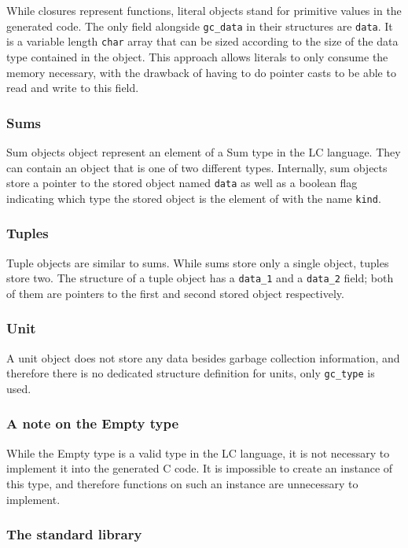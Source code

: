 \documentclass[12pt]{article}
\begin{document}
While closures represent functions, literal objects stand for primitive values
in the generated code. The only field alongside \verb$gc_data$ in their
structures are \verb$data$. It is a variable length \verb$char$ array that can
be sized according to the size of the data type contained in the object. This
approach allows literals to only consume the memory necessary, with the drawback
of having to do pointer casts to be able to read and write to this field.

\subsubsection{Sums}

Sum objects object represent an element of a Sum type in the LC language. They
can contain an object that is one of two different types. Internally, sum
objects store a pointer to the stored object named \verb$data$ as well as a
boolean flag indicating which type the stored object is the element of with the
name \verb$kind$.

\subsubsection{Tuples}

Tuple objects are similar to sums. While sums store only a single object, tuples
store two. The structure of a tuple object has a \verb$data_1$ and a
\verb$data_2$ field; both of them are pointers to the first and second stored
object respectively.

\subsubsection{Unit}

A unit object does not store any data besides garbage collection information,
and therefore there is no dedicated structure definition for units, only
\verb$gc_type$ is used. 

\subsubsection{A note on the Empty type}

While the Empty type is a valid type in the LC language, it is not necessary to
implement it into the generated C code. It is impossible to create an instance
of this type, and therefore functions on such an instance are unnecessary to
implement.

\subsubsection{The standard library}
\end{document}
